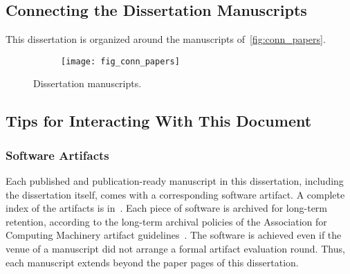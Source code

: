 \subsection{Connecting the Dissertation Manuscripts}
\label{subsec:connecting-the-dissertation-manuscripts}

This dissertation is organized around the manuscripts of~\autoref{fig:conn_papers}.

\begin{figure}[p]
\begin{subfigure}{\textwidth}
\texttt{[image: fig\_conn\_papers]}
\end{subfigure}
\begin{center}
\end{center}
\caption{Dissertation manuscripts.}
\label{fig:conn_papers}
\end{figure}

\subsection{Tips for Interacting With This Document}
\label{subsec:tips}

\subsubsection{Software Artifacts}\label{subsub:sw}
Each published and publication-ready manuscript in this dissertation, including the dissertation itself, comes with a corresponding software artifact.
A complete index of the artifacts is in~.
Each piece of software is archived for long-term retention, according to the long-term archival policies of the Association for Computing Machinery artifact guidelines~\cite{acm_badging}.
The software is achieved even if the venue of a manuscript did not arrange a formal artifact evaluation round.
Thus, each manuscript extends beyond the paper pages of this dissertation.

